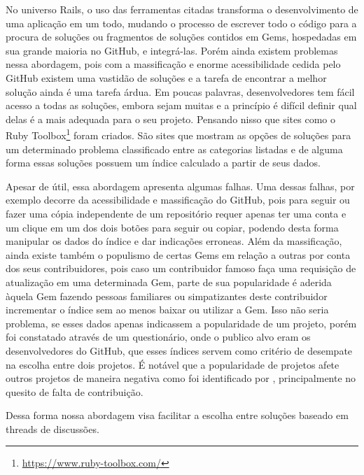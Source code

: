 No universo Rails, o uso das ferramentas citadas transforma o desenvolvimento de uma aplicação em um todo, mudando o processo de escrever todo o código para a procura de soluções ou fragmentos de soluções contidos em Gems, hospedadas em sua grande maioria no GitHub, e integrá-las. Porém ainda existem problemas nessa abordagem, pois com a massificação e enorme acessibilidade cedida pelo GitHub existem uma vastidão de soluções e a tarefa de encontrar a melhor solução ainda é uma tarefa árdua. Em poucas palavras, desenvolvedores tem fácil acesso a todas as soluções, embora sejam muitas e a princípio é difícil definir qual delas é a mais adequada para o seu projeto. Pensando nisso que sites como o Ruby Toolbox\footnote{\url{https://www.ruby-toolbox.com/}} foram criados. São sites que mostram as opções de soluções para um determinado problema classificado entre as categorias listadas e de alguma forma essas soluções possuem um índice calculado a partir de seus dados.

Apesar de útil, essa abordagem apresenta algumas falhas. Uma dessas falhas, por exemplo decorre da acessibilidade e massificação do GitHub, pois para seguir ou fazer uma cópia independente de um repositório requer apenas ter uma conta e um clique em um dos dois botões para seguir ou copiar, podendo desta forma manipular os dados do índice e dar indicações erroneas. Além da massificação, ainda existe também o populismo de certas Gems em relação a outras por conta dos seus contribuidores, pois caso um contribuidor famoso faça uma requisição de atualização em uma determinada Gem, parte de sua popularidade é aderida àquela Gem fazendo pessoas familiares ou simpatizantes deste contribuidor incrementar o índice sem ao menos baixar ou utilizar a Gem. Isso não seria problema, se esses dados apenas indicassem a popularidade de um projeto, porém foi constatado através de um questionário, onde o publico alvo eram os desenvolvedores do GitHub, que esses índices servem como critério de desempate na escolha entre dois projetos. É notável que a popularidade de projetos afete outros projetos de maneira negativa como foi identificado por \cite{michlmayr:quality_problems}, principalmente no quesito de falta de contribuição. 

Dessa forma nossa abordagem visa facilitar a escolha entre soluções baseado em threads de discussões.